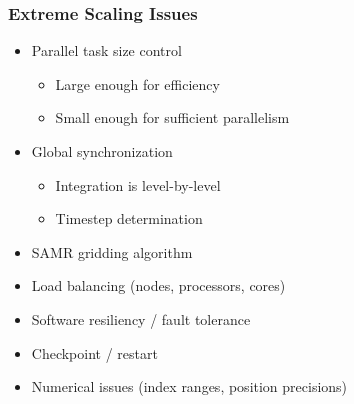 \begin{frame}[fragile] \frametitle{Extreme Scaling Issues}
   \begin{itemize}
      \item {}Parallel task size control
      \begin{itemize}
          \item {}Large enough for efficiency
          \item {}Small enough for sufficient parallelism
      \end{itemize}
      \item {}Global synchronization
      \begin{itemize}
          \item {}Integration is level-by-level
          \item {}Timestep determination
      \end{itemize}
      \item {}SAMR gridding algorithm
      \item {}Load balancing (nodes, processors, cores)
      \item {}Software resiliency / fault tolerance
      \item {}Checkpoint / restart
      \item {}Numerical issues (index ranges, position precisions)
   \end{itemize}
\end{frame}
